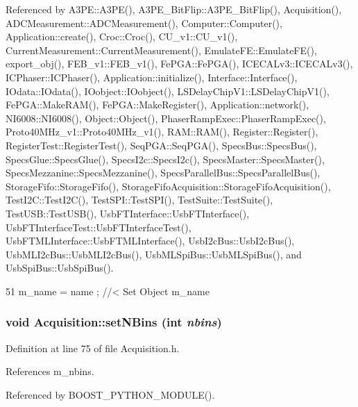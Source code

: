 Referenced by A3PE::A3PE(), A3PE\_\-BitFlip::A3PE\_\-BitFlip(), Acquisition(), ADCMeasurement::ADCMeasurement(), Computer::Computer(), Application::create(), Croc::Croc(), CU\_\-v1::CU\_\-v1(), CurrentMeasurement::CurrentMeasurement(), EmulateFE::EmulateFE(), export\_\-obj(), FEB\_\-v1::FEB\_\-v1(), FePGA::FePGA(), ICECALv3::ICECALv3(), ICPhaser::ICPhaser(), Application::initialize(), Interface::Interface(), IOdata::IOdata(), IOobject::IOobject(), LSDelayChipV1::LSDelayChipV1(), FePGA::MakeRAM(), FePGA::MakeRegister(), Application::network(), NI6008::NI6008(), Object::Object(), PhaserRampExec::PhaserRampExec(), Proto40MHz\_\-v1::Proto40MHz\_\-v1(), RAM::RAM(), Register::Register(), RegisterTest::RegisterTest(), SeqPGA::SeqPGA(), SpecsBus::SpecsBus(), SpecsGlue::SpecsGlue(), SpecsI2c::SpecsI2c(), SpecsMaster::SpecsMaster(), SpecsMezzanine::SpecsMezzanine(), SpecsParallelBus::SpecsParallelBus(), StorageFifo::StorageFifo(), StorageFifoAcquisition::StorageFifoAcquisition(), TestI2C::TestI2C(), TestSPI::TestSPI(), TestSuite::TestSuite(), TestUSB::TestUSB(), UsbFTInterface::UsbFTInterface(), UsbFTInterfaceTest::UsbFTInterfaceTest(), UsbFTMLInterface::UsbFTMLInterface(), UsbI2cBus::UsbI2cBus(), UsbMLI2cBus::UsbMLI2cBus(), UsbMLSpiBus::UsbMLSpiBus(), and UsbSpiBus::UsbSpiBus().


\begin{DoxyCode}
51 { m_name  = name  ; } //< Set Object m_name
\end{DoxyCode}
\hypertarget{classAcquisition_a6ee040a009aa48f848b1e12434135db9}{
\subsubsection[{setNBins}]{\setlength{\rightskip}{0pt plus 5cm}void Acquisition::setNBins (int {\em nbins})}}
\label{classAcquisition_a6ee040a009aa48f848b1e12434135db9}


Definition at line 75 of file Acquisition.h.

References m\_\-nbins.

Referenced by BOOST\_\-PYTHON\_\-MODULE().


